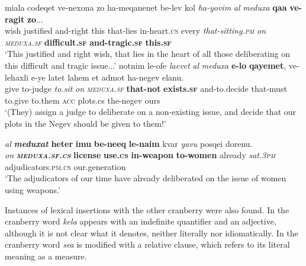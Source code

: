 \documentclass[output=paper]{langsci/langscibook}
\begin{document}
        \ea\label{she:meduxa-ins-int-mod}
             \gll mi{\shin}{\alef}ala codeqet ve-nexona zo ha-meqanenet be-lev kol \textit{ha-yo{\shin}vim} \textit{{\ayin}al} \textit{meduxa} \textbf{qa{\shinB}a} \textbf{ve-{\tetB}ragit} \textbf{zo}...\\
                 wish justified and-right this that-lies in-heart.\textsc{cs} every \textit{that-sitting.\textsc{pm}} \textit{on} \textit{\textsc{meduxa}.\textsc{sf}} \textbf{difficult.\textsc{sf}} \textbf{and-tragic.\textsc{sf}} \textbf{this.\textsc{sf}}\\
            \glt `This justified and right wish, that lies in the heart of all those deliberating on this difficult and tragic issue...'
        \z
        \ea\label{she:meduxa-rc-insertion}
            \gll notnim le-{\shin}ofe{\tet} \textit{la{\shin}evet} \textit{{\ayin}al} \textit{meduxa} \textbf{{\shinB}e-lo} \textbf{qayemet}, ve-lehaxli{\tet} {\shin}e-ye{\shin} latet lahem {\alef}et {\alef}admot ha-negev {\shin}elanu.\\
                give to-judge \textit{to.sit} \textit{on} \textit{\textsc{meduxa}.\textsc{sf}} \textbf{that-not} \textbf{exists.\textsc{sf}} and-to.decide that-must to.give to.them \textsc{acc} plots.cs the-negev ours\\
            \glt `(They) assign a judge to deliberate on a non-existing issue, and decide that our plots in the Negev should be given to them!'
        \z

    \ea\label{she:meduxa-cs-insertion}
        \gll \textit{{\ayin}al} \textit{\textbf{meduxat}} \textbf{heter} \textbf{{\shinB}imu{\shinB}} \textbf{be-ne{\shinB}eq} \textbf{le-na{\shinB}im} kvar \textit{ya{\shin}vu} posqei dorenu.\\
            \textit{on} \textit{\textbf{\textsc{meduxa}.\textsc{sf}.\textsc{cs}}} \textbf{license} \textbf{use.\textsc{cs}} \textbf{in-weapon} \textbf{to-women} already \textit{sat.\textsc{3pm}} adjudicators.\textsc{pm}.\textsc{cs} our.generation \\
        \glt `The adjudicators of our time have already deliberated on the issue of women using weapons.'
    \z

Instances of lexical insertions with the other cranberry  were also found. In  the cranberry word \textit{kela{\het}} appears with an indefinite quantifier and an adjective, although it is not clear what it denotes, neither literally nor idiomatically. In  the cranberry word \textit{se{\alef}a} is modified with a relative clause, which refers to its literal meaning as a measure.
\end{document}
